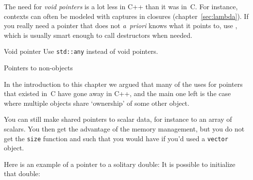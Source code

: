 The need for \emph{void pointers}
is a lot less in C++ than it was in~C. For
instance, contexts can often be modeled with captures in closures
(chapter~\ref{sec:lambda}). If you really need a pointer that does not
\textit{a~priori} knows what it points to, use ,
which is usually smart enough to call destructors when needed.

\begin{slide}{Void pointer}
  \label{sl:void-ptr}
  Use \lstinline{std::any} instead of void pointers.
\end{slide}

 {Pointers to non-objects}

In the introduction to this chapter we argued that many of the uses
for pointers that existed in~C have gone away in C++, and the main one
left is the case where multiple objects share `ownership' of some
other object.

You can still make shared pointers to scalar data, for instance to an
array of scalars. You then get the advantage of the memory management,
but you do not get the \lstinline{size} function and such that you would have
if you'd used a \lstinline{vector} object.

Here is an example of a pointer to a solitary double:
%
%
It is possible to initialize that double:
%


